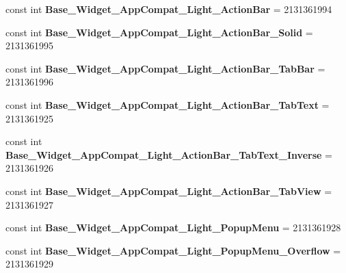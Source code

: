 \begin{DoxyCompactItemize}
const int {\bfseries Base\+\_\+\+Widget\+\_\+\+App\+Compat\+\_\+\+Light\+\_\+\+Action\+Bar} = 2131361994
\item 
\mbox{\label{class_sample_app_1_1_droid_1_1_resource_1_1_style_a31f2afabfd093a0342afb5c68d0732f1}} 
const int {\bfseries Base\+\_\+\+Widget\+\_\+\+App\+Compat\+\_\+\+Light\+\_\+\+Action\+Bar\+\_\+\+Solid} = 2131361995
\item 
\mbox{\label{class_sample_app_1_1_droid_1_1_resource_1_1_style_a15010b3898c0f9a071677c0149ac1f16}} 
const int {\bfseries Base\+\_\+\+Widget\+\_\+\+App\+Compat\+\_\+\+Light\+\_\+\+Action\+Bar\+\_\+\+Tab\+Bar} = 2131361996
\item 
\mbox{\label{class_sample_app_1_1_droid_1_1_resource_1_1_style_a74c54da803951976ad7defa73624faad}} 
const int {\bfseries Base\+\_\+\+Widget\+\_\+\+App\+Compat\+\_\+\+Light\+\_\+\+Action\+Bar\+\_\+\+Tab\+Text} = 2131361925
\item 
\mbox{\label{class_sample_app_1_1_droid_1_1_resource_1_1_style_a953540c32df518e1f6d03a498f20c81b}} 
const int {\bfseries Base\+\_\+\+Widget\+\_\+\+App\+Compat\+\_\+\+Light\+\_\+\+Action\+Bar\+\_\+\+Tab\+Text\+\_\+\+Inverse} = 2131361926
\item 
\mbox{\label{class_sample_app_1_1_droid_1_1_resource_1_1_style_a5783e80d69db25d6660be742c3114931}} 
const int {\bfseries Base\+\_\+\+Widget\+\_\+\+App\+Compat\+\_\+\+Light\+\_\+\+Action\+Bar\+\_\+\+Tab\+View} = 2131361927
\item 
\mbox{\label{class_sample_app_1_1_droid_1_1_resource_1_1_style_a2a41804cac9f52f73c31edcd73b054c5}} 
const int {\bfseries Base\+\_\+\+Widget\+\_\+\+App\+Compat\+\_\+\+Light\+\_\+\+Popup\+Menu} = 2131361928
\item 
\mbox{\label{class_sample_app_1_1_droid_1_1_resource_1_1_style_a35380d90178848bb61d8436404501dd4}} 
const int {\bfseries Base\+\_\+\+Widget\+\_\+\+App\+Compat\+\_\+\+Light\+\_\+\+Popup\+Menu\+\_\+\+Overflow} = 2131361929

\end{DoxyCompactItemize}
